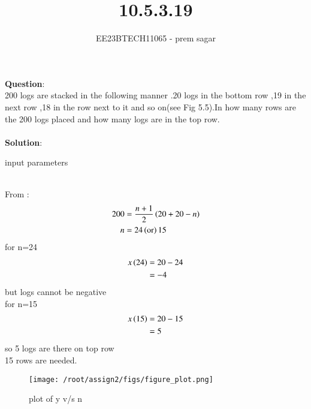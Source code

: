 \documentclass[journal,12pt,twocolumn]{IEEEtran}
\theoremstyle{remark}
\begin{document}

\vspace{3cm}

\title{10.5.3.19}
\author{EE23BTECH11065 - prem sagar}
\maketitle
\newpage

\bigskip 

\renewcommand{\thefigure}{\theenumi}
\renewcommand{\thetable}{\theenumi}
\textbf{Question}:\\ 200 logs are stacked in the following manner .20 logs in the bottom row ,19 in the next row ,18 in the row next to it and so on(see Fig 5.5).In how many rows are the 200 logs placed and how many logs are in the top row.
\\\\\textbf{Solution}:
\begin{table}[!ht]
  \centering
  \renewcommand\thetable{1}
  
  \caption{input parameters}
  \label{tab:10.5.3.19}
  \end{table}
  \\From {}:
\begin{align}
200&=\frac{n+1}{2}\left(20+20-n\right)
\\n&=24 \left(\text{or}\right) 15
\end{align}
for n=24
\begin{align}
x\left(24\right)&=20-24
\\&={-4}
\end{align}
but logs cannot be negative
\\for n=15
\begin{align}
x\left(15\right)&=20-15
\\&=5
\end{align}
so 5 logs are there on top row
\\ 15 rows are needed.
\\\begin{figure}[h]
  \renewcommand\thefigure{1}
    \centering
    \texttt{[image: /root/assign2/figs/figure\_plot.png]}
    \caption{plot of y v/s n}
    \label{fig:enter-label}
\end{figure}
\end{document}
